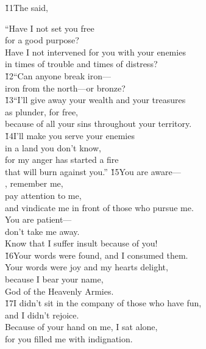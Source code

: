 \v{11}The  said,

\begin{poetry}
\poeml ``Have I not set you free \\
\poemll    for a good purpose? \\
\poeml Have I not intervened for you with your enemies \\
\poemll    in times of trouble and times of distress? \\
\poeml \v{12}``Can anyone break iron--- \\
\poemll    iron from the north---or bronze? \\
\poeml \v{13}``I'll give away your wealth and your treasures \\
\poemll    as plunder, for free, \\
\poemlll       because of all your sins throughout your territory. \\
\poeml \v{14}I'll make you serve your enemies \\
\poemll    in a land you don't know, \\
\poeml for my anger has started a fire \\
\poemll    that will burn against you.''
\poeml \v{15}You are aware--- \\
\poemll    {}, remember me, \\
\poeml pay attention to me, \\
\poemll    and vindicate me in front of those who pursue me. \\
\poeml You are patient--- \\
\poemll    don't take me away. \\
\poemlll       Know that I suffer insult because of you! \\
\poeml \v{16}Your words were found, and I consumed them. \\
\poemll    Your words were joy and my hearts delight, \\
\poeml because I bear your name, \\
\poemll    {} God of the Heavenly Armies. \\
\poeml \v{17}I didn't sit in the company of those who have fun, \\
\poemll    and I didn't rejoice. \\
\poeml Because of your hand on me, I sat alone, \\
\poemll    for you filled me with indignation. \\

\end{poetry}
